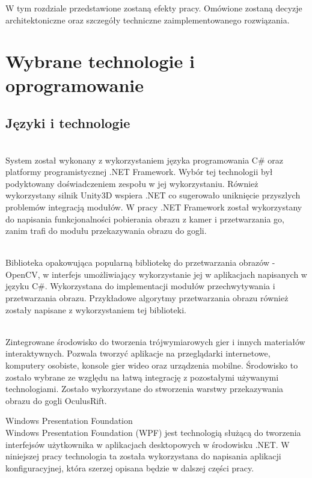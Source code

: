 \documentclass[a4paper,11pt,twoside]{report}
\theoremstyle{definition}
\begin{document}
W tym rozdziale przedstawione zostaną efekty pracy. Omówione zostaną decyzje architektoniczne oraz szczegóły techniczne zaimplementowanego rozwiązania.

\section{Wybrane technologie i oprogramowanie}

\subsection{Języki i technologie }

\begin{description}
\item [Język programowania C\# ] \hfill \\
System został wykonany z wykorzystaniem języka programowania C\# oraz platformy programistycznej .NET Framework. Wybór tej technologii był podyktowany doświadczeniem zespołu w jej wykorzystaniu. Również wykorzystany silnik Unity3D wspiera .NET co sugerowało uniknięcie przyszlych problemów integracją modułów. W pracy .NET Framework został wykorzystany do napisania funkcjonalności pobierania obrazu z kamer i przetwarzania go, zanim trafi do modułu przekazywania obrazu do gogli.

\item [EmguCV] \hfill \\
Biblioteka opakowująca popularną bibliotekę do przetwarzania obrazów - OpenCV, w interfejs umożliwiający wykorzystanie jej w aplikacjach napisanych w języku C\#. Wykorzystana do implementacji modułów przechwytywania i przetwarzania obrazu. Przykładowe algorytmy przetwarzania obrazu również zostały napisane z wykorzystaniem tej biblioteki.

\item [Silnik Unity3D] \hfill \\
Zintegrowane środowisko do tworzenia trójwymiarowych gier i innych materiałów interaktywnych.  Pozwala tworzyć aplikacje na przeglądarki internetowe, komputery osobiste, konsole gier wideo oraz urządzenia mobilne. Środowisko to zostało wybrane ze względu na łatwą integrację z pozostałymi używanymi technologiami. Zostało wykorzystane do stworzenia warstwy przekazywania obrazu do gogli OculusRift.

\begin{minipage}{\linewidth}
\item [Windows Presentation Foundation] \hfill \\
Windows Presentation Foundation (WPF) jest technologią służącą do tworzenia interfejsów użytkownika w aplikacjach desktopowych w środowisku .NET. W niniejszej pracy technologia ta została wykorzystana do napisania aplikacji konfiguracyjnej, która szerzej opisana będzie w dalszej części pracy.
\end{minipage}\\


\end{description}
\end{document}
